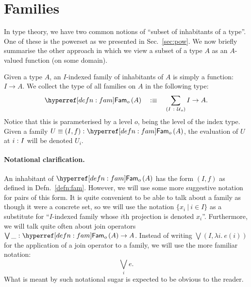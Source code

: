 \section{Families}\label{sec:fam}

In type theory, we have two common notions of ``subset of inhabitants of a type''. One of
these is the powerset as we presented in Sec.~\ref{sec:pow}. We now briefly summarise the
other approach in which we view a subset of a type $A$ as an $A$-valued function (on some
domain).

\begin{defn}[Family]\label{defn:fam}
  Given a type $A$, an $I$-indexed family of inhabitants of $A$ is simply a function:
  $I \rightarrow A$. We collect the type of all families on $A$ in the following type:
  \begin{equation*}
    \sub{o}{A} \quad\is\quad \sigmaty{I}{\univ{}_o}{I \rightarrow A}.
  \end{equation*}
  Notice that this is parameterised by a level $o$, being the level of the index type.
  Given a family $\oftyI{U \equiv (I, f)}{\sub{o}{A}}$, the evaluation of $U$ at $i\hspace{0.1mm}:\hspace{0.1mm}I$
  will be denoted $U_i$.
\end{defn}

\paragraph*{Notational clarification.} An inhabitant of $\sub{o}{A}$ has the form
$(I, f)$ as defined in Defn.~\ref{defn:fam}. However, we will use some more suggestive
notation for pairs of this form. It is quite convenient to be able to talk about a family
as though it were a concrete set, so we will use the notation $\{ x_i ~|~ i \in I \}$ as a
substitute for ``$I$-indexed family whose $i$th projection is denoted $x_i$''. Furthermore,
we will talk quite often about join operators $\oftyI{\bigvee\_}{\sub{o}{A} \rightarrow A}$. Instead of
writing $\bigvee (I, \lambda i.~e(i))$ for the application of a join operator to a family, we will
use the more familiar notation:
\begin{equation}\label{eqn:join-syntax}
  \bigvee_i e.
\end{equation}
What is meant by such notational sugar is expected to be obvious to the reader.

